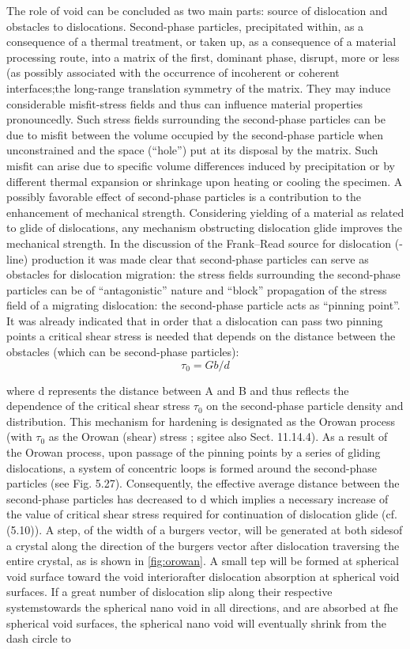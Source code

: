 \documentclass[materials,article,submit,moreauthors,pdftex,10pt,a4paper]{Definitions/mdpi}
\begin{document}
The role of void can be concluded as two main parts: source of dislocation and obstacles to dislocations.  Second-phase particles, precipitated within, as a consequence of a thermal treatment, or taken up, as a consequence of a material processing route, into a matrix of the first, dominant phase, disrupt, more or less (as possibly associated with the occurrence of incoherent or coherent interfaces;the long-range translation symmetry of the matrix. They may induce considerable misfit-stress fields and thus can influence material properties pronouncedly. Such stress fields surrounding the second-phase particles can be due to misfit between the volume occupied by the second-phase particle when unconstrained and the space (“hole”) put at its disposal by the matrix. Such misfit can arise due to specific volume differences induced by precipitation or by different thermal expansion or shrinkage upon heating or cooling the specimen. A possibly favorable effect of second-phase particles is a contribution to the enhancement of mechanical strength. Considering yielding of a material as related to glide of dislocations, any mechanism obstructing dislocation glide improves the mechanical strength. In the discussion of the Frank–Read source for dislocation (-line) production  it was made clear that second-phase particles can serve as obstacles for dislocation migration: the stress fields surrounding the second-phase particles can be of “antagonistic” nature and “block” propagation of the stress field of a migrating dislocation: the second-phase particle acts as “pinning point”. It was already indicated that in order that a dislocation can pass two pinning points a critical shear stress is needed that depends on the distance between the obstacles (which can be second-phase particles):
\begin{equation} \label{eq:orowan} 
\tau_0 = Gb/d
\end{equation}

where d represents the distance between A and B and thus reflects the dependence of the critical shear stress $\tau_0$ on the second-phase particle density and distribution. This mechanism for hardening is designated as the Orowan process (with $\tau_0$ as the Orowan
(shear) stress ; sgitee also Sect. 11.14.4). As a result of the Orowan process, upon passage of the pinning points by a series of gliding dislocations, a system of concentric loops is formed around the second-phase particles (see Fig. 5.27). Consequently, the effective average distance between the second-phase particles has decreased to d which implies a necessary increase of the value of critical shear stress required for continuation of dislocation glide (cf. (5.10)).
A step, of the width of a burgers vector, will be generated at both sidesof a crystal along the direction of the burgers vector after dislocation traversing the entire crystal, as is shown in \ref{fig:orowan}. A small tep will be formed at spherical void surface toward the void interiorafter dislocation absorption at spherical void surfaces. If a great number of dislocation slip along their respective systemstowards the spherical nano void in all directions, and are absorbed at fhe spherical void surfaces, the spherical nano void will eventually shrink from the dash circle to
\end{document}
